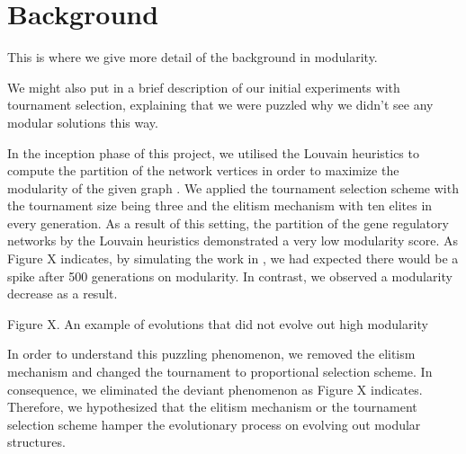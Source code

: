 \section{Background}
This is where we give more detail of the background in modularity.

We might also put in a brief description of our initial experiments with tournament selection, explaining that we were puzzled why we didn't see any modular solutions this way.

In the inception phase of this project, we utilised the Louvain heuristics to compute the partition of the network vertices in order to maximize the modularity of the given graph \cite{blondel2008louvain}. We applied the tournament selection scheme with the tournament size being three and the elitism mechanism with ten elites in every generation. As a result of this setting, the partition of the gene regulatory networks by the Louvain heuristics demonstrated a very low modularity score. As Figure X indicates, by simulating the work in \cite{espinosa2010specialization}, we had expected there would be a spike after 500 generations on modularity. In contrast, we observed a modularity decrease as a result. 

Figure X. An example of evolutions that did not evolve out high modularity

In order to understand this puzzling phenomenon, we removed the elitism mechanism and changed the tournament to proportional selection scheme. In consequence, we eliminated the deviant phenomenon as Figure X indicates. Therefore, we hypothesized that the elitism mechanism or the tournament selection scheme hamper the evolutionary process on evolving out modular structures. 

